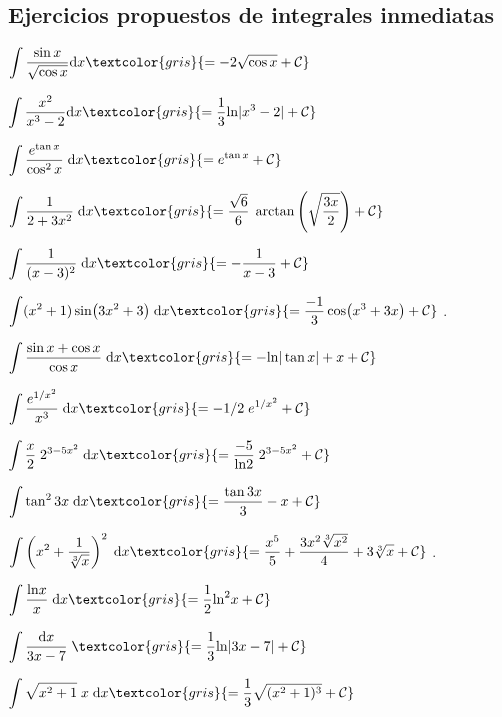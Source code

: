 \subsection{Ejercicios propuestos de integrales inmediatas}
\begin{multicols}{2}
\begin{enumerate}[a) ]
\item $\displaystyle \int \dfrac {\sin x}{\sqrt{\cos x}} \dd x \textcolor{gris}{= -2 \sqrt{\cos x}+\mathcal C}$ 
\item $\displaystyle \int \dfrac {x^2}{x^3-2} \dd x \textcolor{gris}{=\dfrac 1 3 \mathrm{ln} |x^3-2|+\mathcal C}$
\item $\displaystyle \int \dfrac {e^{\tan x}}{\cos^2 x} \; \dd x \textcolor{gris}{= e^{\tan x} +\mathcal C}$ 
\item $\displaystyle \int \dfrac {1}{2+3x^2} \; \dd x \textcolor{gris}{ = \dfrac {\sqrt{6}}{6}\; \arctan \left( \sqrt{ \dfrac {3x}{2} } \right) +\mathcal C }$ 
\item $\displaystyle \int \dfrac {1}{(x-3)^2} \; \dd x \textcolor{gris}{= -\dfrac {1}{x-3} +\mathcal C}$ 
\item \footnotesize{ $\displaystyle \int (x^2+1) \sin (3x^2+3) \; \dd x \textcolor{gris}{= \dfrac {-1}{3} \cos (x^3+3x) +\mathcal C}$ } \normalsize{.}
\item  $\displaystyle \int \dfrac {\sin x + \cos x}{\cos x} \; \dd x \textcolor{gris}{= -\mathrm{ln}|\tan x|+ x +\mathcal C}$ 
\item  $\displaystyle \int \dfrac {e^{1/x^2}}{x^3} \; \dd x \textcolor{gris}{= -1/2 \; e^{1/x^2} +\mathcal C}$ 
\item  $\displaystyle \int \dfrac x 2 \; 2^{3-5x^2} \; \dd x \textcolor{gris}{= \dfrac {-5} {\mathrm{ln} 2}\; 2^{3-5x^2}+\mathcal C}$
\item  $\displaystyle \int 	\tan^2 3x \; \dd x \textcolor{gris}{= \dfrac {\tan 3x}{3}-x +\mathcal C}$
\item  \footnotesize{ $\displaystyle \int \left( x^2+\dfrac {1}{\sqrt[3]{x}} \right)^2 \; \dd x \textcolor{gris}{= \dfrac {x^5}{5}+\dfrac {3 x^2 \sqrt[3]{x^2}}{4}+3\sqrt[3]{x} +\mathcal C}$ \normalsize{.}
\item  $\displaystyle \int \dfrac {\mathrm{ln} x}{x} \; \dd x \textcolor{gris}{= \frac 1 2 \mathrm{ln}^2 x +\mathcal C}$}
\item  $\displaystyle \int \dfrac {\dd x }{3x-7} \; \textcolor{gris}{= \frac 1 3 \mathrm{ln}|3x-7| +\mathcal C}$
\item  $\displaystyle \int \sqrt{x^2+1}\; x \; \dd x \textcolor{gris}{= \frac 1 3 \sqrt{(x^2+1)^3} +\mathcal C}$

\end{enumerate}
\end{multicols}
